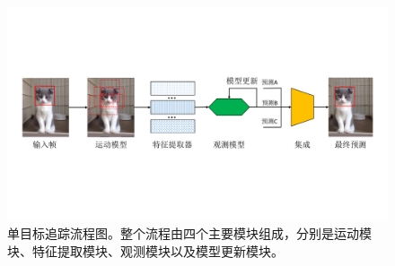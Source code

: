 \begin{figure}[t]
	\centering
	\includegraphics[trim={1cm, 6cm, 1cm, 6cm}, clip,width=\textwidth]{./imgs/sot_pipeline.pdf}
	\caption{单目标追踪流程图。整个流程由四个主要模块组成，分别是运动模块、特征提取模块、观测模块以及模型更新模块。}
	\label{fig:sot_pipeline}
\end{figure}
